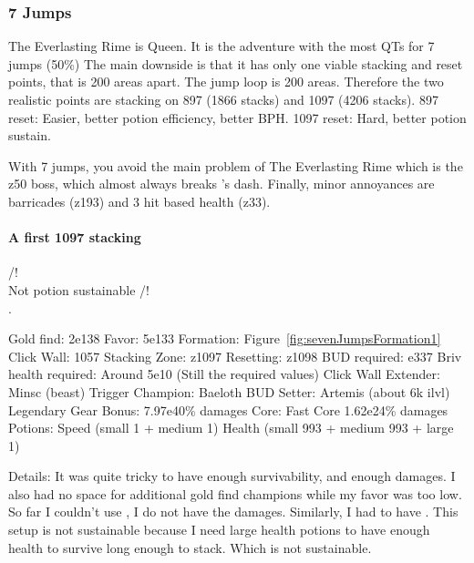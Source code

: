 \documentclass{article}
\begin{document}
\subsubsection{7 Jumps}

The Everlasting Rime is Queen.
It is the adventure with the most QTs for 7 jumps (50\%)
The main downside is that it has only one viable stacking and reset points, that is 200 areas apart.
The jump loop is 200 areas.
Therefore the two realistic points are stacking on 897 (1866 stacks) and 1097 (4206 stacks).
897 reset: Easier, better potion efficiency, better BPH.
1097 reset: Hard, better potion sustain.

With 7 jumps, you avoid the main problem of The Everlasting Rime which is the z50 boss, which almost always breaks \shandie's dash.
Finally, minor annoyances are barricades (z193) and 3 hit based health (z33).


\paragraph{A first 1097 stacking}

/!\\ Not potion sustainable /!\\.

Gold find: 2e138\newline
Favor: 5e133\newline
Formation: Figure~\ref{fig:sevenJumpsFormation1}\newline
Click Wall: 1057\newline
Stacking Zone: z1097\newline
Resetting: z1098\newline
BUD required: e337\newline
Briv health required: Around 5e10 (Still the required values)\newline
Click Wall Extender: Minsc (beast)\newline
Trigger Champion: Baeloth\newline
BUD Setter: Artemis (about 6k ilvl)\newline
Legendary Gear Bonus: 7.97e40\% damages\newline
Core: Fast Core 1.62e24\% damages\newline
Potions: Speed (small 1 + medium 1) Health (small 993 + medium 993 + large 1)

Details:
It was quite tricky to have enough survivability, and enough damages.
I also had no space for additional gold find champions while my favor was too low.
So far I couldn't use \widdle, I do not have the damages.
Similarly, I had to have \tyril.
This setup is not sustainable because I need large health potions to have enough health to survive long enough to stack.
Which is not sustainable.
\end{document}
